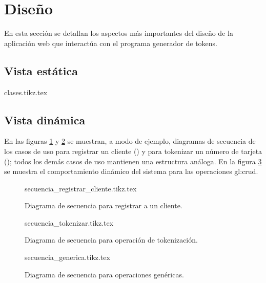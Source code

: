 %
%

\section{Diseño}

En esta sección se detallan los aspectos más importantes del diseño de la
aplicación web que interactúa con el programa generador de tokens.

\subsection{Vista estática}

\begin{sidewaysfigure}
  \begin{center}
    {clases.tikz.tex}
    \caption{Diagrama de clases de aplicación web.}
    \label{fig:clases_aplicacion_web}
  \end{center}
\end{sidewaysfigure}

\subsection{Vista dinámica}

En las figuras \ref{fig:secuencia_registrar_cliente} y
\ref{fig:secuencia_tokenizar} se muestran, a modo de ejemplo, diagramas de
secuencia de los casos de uso para registrar un cliente
() y para tokenizar un número de tarjeta
(); todos los demás casos de uso mantienen
una estructura análoga. En la figura \ref{fig:secuencia_generia} se muestra el
comportamiento dinámico del sistema para las operaciones \gls{gl:crud}.

%
%

\begin{figure}
  \begin{center}
    {secuencia_registrar_cliente.tikz.tex}
    \caption{Diagrama de secuencia para registrar a un cliente.}
    \label{fig:secuencia_registrar_cliente}
  \end{center}
\end{figure}

\begin{figure}
  \begin{center}
    {secuencia_tokenizar.tikz.tex}
    \caption{Diagrama de secuencia para operación de tokenización.}
    \label{fig:secuencia_tokenizar}
  \end{center}
\end{figure}

\begin{figure}
  \begin{center}
    {secuencia_generica.tikz.tex}
    \caption{Diagrama de secuencia para operaciones genéricas.}
    \label{fig:secuencia_generia}
  \end{center}
\end{figure}
